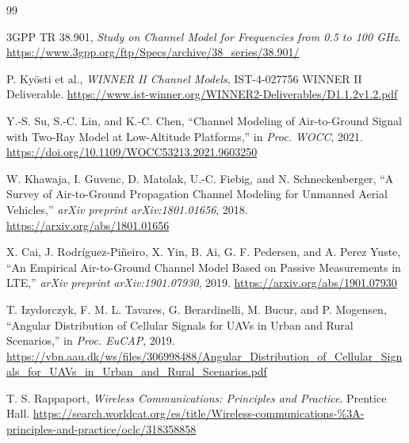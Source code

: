 \documentclass[11pt,a4paper]{article}
\begin{document}
\begin{thebibliography}{99}

3GPP TR 38.901,
\emph{Study on Channel Model for Frequencies from 0.5 to 100 GHz}.
\url{https://www.3gpp.org/ftp/Specs/archive/38_series/38.901/}

P. Ky\"osti et al.,
\emph{WINNER II Channel Models},
IST-4-027756 WINNER II Deliverable.
\url{https://www.ist-winner.org/WINNER2-Deliverables/D1.1.2v1.2.pdf}

Y.-S. Su, S.-C. Lin, and K.-C. Chen,
``Channel Modeling of Air-to-Ground Signal with Two-Ray Model at Low-Altitude Platforms,''
in \emph{Proc. WOCC}, 2021.
\url{https://doi.org/10.1109/WOCC53213.2021.9603250}

W. Khawaja, I. Guvenc, D. Matolak, U.-C. Fiebig, and N. Schneckenberger,
``A Survey of Air-to-Ground Propagation Channel Modeling for Unmanned Aerial Vehicles,''
\emph{arXiv preprint arXiv:1801.01656}, 2018.
\url{https://arxiv.org/abs/1801.01656}

X. Cai, J. Rodr\'iguez-Pi\~neiro, X. Yin, B. Ai, G. F. Pedersen, and A. Perez Yuste,
``An Empirical Air-to-Ground Channel Model Based on Passive Measurements in LTE,''
\emph{arXiv preprint arXiv:1901.07930}, 2019.
\url{https://arxiv.org/abs/1901.07930}

T. Izydorczyk, F. M. L. Tavares, G. Berardinelli, M. Bucur, and P. Mogensen,
``Angular Distribution of Cellular Signals for UAVs in Urban and Rural Scenarios,''
in \emph{Proc. EuCAP}, 2019.
\url{https://vbn.aau.dk/ws/files/306998488/Angular_Distribution_of_Cellular_Signals_for_UAVs_in_Urban_and_Rural_Scenarios.pdf}

T. S. Rappaport,
\emph{Wireless Communications: Principles and Practice}.
Prentice Hall.
\url{https://search.worldcat.org/es/title/Wireless-communications-%3A-principles-and-practice/oclc/318358858}

\end{thebibliography}
\end{document}
